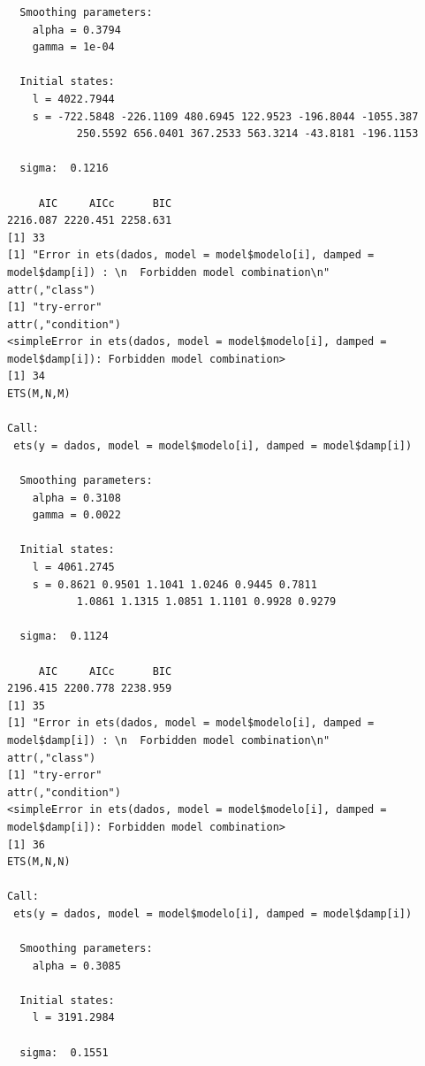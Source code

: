 \documentclass[
  letterpaper,
  DIV=11,
  numbers=noendperiod]{scrartcl}
\begin{document}
\begin{verbatim}
  Smoothing parameters:
    alpha = 0.3794 
    gamma = 1e-04 

  Initial states:
    l = 4022.7944 
    s = -722.5848 -226.1109 480.6945 122.9523 -196.8044 -1055.387
           250.5592 656.0401 367.2533 563.3214 -43.8181 -196.1153

  sigma:  0.1216

     AIC     AICc      BIC 
2216.087 2220.451 2258.631 
[1] 33
[1] "Error in ets(dados, model = model$modelo[i], damped = model$damp[i]) : \n  Forbidden model combination\n"
attr(,"class")
[1] "try-error"
attr(,"condition")
<simpleError in ets(dados, model = model$modelo[i], damped = model$damp[i]): Forbidden model combination>
[1] 34
ETS(M,N,M) 

Call:
 ets(y = dados, model = model$modelo[i], damped = model$damp[i]) 

  Smoothing parameters:
    alpha = 0.3108 
    gamma = 0.0022 

  Initial states:
    l = 4061.2745 
    s = 0.8621 0.9501 1.1041 1.0246 0.9445 0.7811
           1.0861 1.1315 1.0851 1.1101 0.9928 0.9279

  sigma:  0.1124

     AIC     AICc      BIC 
2196.415 2200.778 2238.959 
[1] 35
[1] "Error in ets(dados, model = model$modelo[i], damped = model$damp[i]) : \n  Forbidden model combination\n"
attr(,"class")
[1] "try-error"
attr(,"condition")
<simpleError in ets(dados, model = model$modelo[i], damped = model$damp[i]): Forbidden model combination>
[1] 36
ETS(M,N,N) 

Call:
 ets(y = dados, model = model$modelo[i], damped = model$damp[i]) 

  Smoothing parameters:
    alpha = 0.3085 

  Initial states:
    l = 3191.2984 

  sigma:  0.1551


\end{verbatim}
\end{document}
